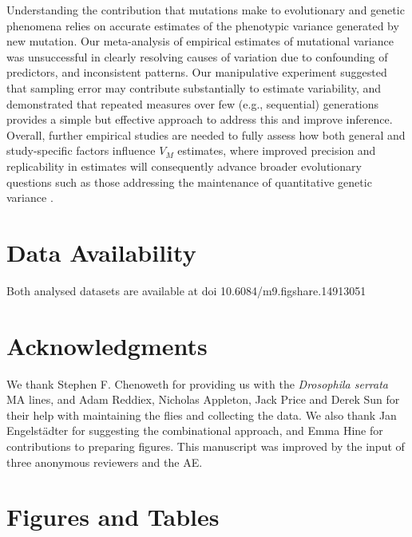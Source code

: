 Understanding the contribution that mutations make to evolutionary and genetic phenomena relies on accurate estimates of the phenotypic variance generated by new mutation. Our meta-analysis of empirical estimates of mutational variance was unsuccessful in clearly resolving causes of variation due to confounding of predictors, and inconsistent patterns. Our manipulative experiment suggested that sampling error may contribute substantially to estimate variability, and demonstrated that repeated measures over few (e.g., sequential) generations provides a simple but effective approach to address this and improve inference. Overall, further empirical studies are needed to fully assess how both general and study-specific factors influence $V_M$ estimates, where improved precision and replicability in estimates will consequently advance broader evolutionary questions such as those addressing the maintenance of quantitative genetic variance \citep{Bart89,John05,Wals18c28}.\par
 	 
\section*{Data Availability}  
Both analysed datasets are available at doi 10.6084/m9.figshare.14913051 \par 
 
\section*{Acknowledgments} 
We thank Stephen F. Chenoweth for providing us with the \textit{Drosophila serrata} MA lines, and Adam Reddiex, Nicholas Appleton, Jack Price and Derek Sun for their help with maintaining the flies and collecting the data. We also thank Jan Engelst\"{a}dter for suggesting the combinational approach, and Emma Hine for contributions to preparing figures. This manuscript was improved by the input of three anonymous reviewers and the AE. \par


\newpage
\section{Figures and Tables} 


